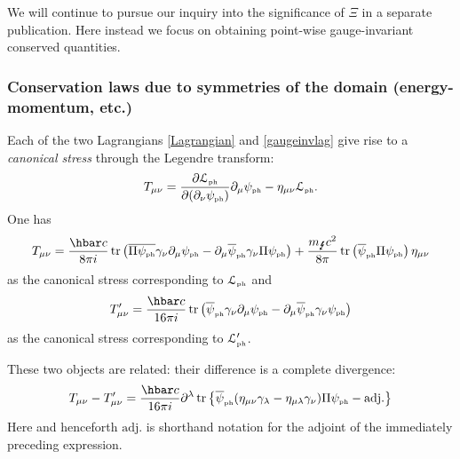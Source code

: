 \documentclass[12pt]{article}
\theoremstyle{definition}
\DeclareMathOperator{\tr}{tr}
\numberwithin{equation}{section}
\newcommand{\beq}{\begin{equation}}
\newcommand{\eeq}{\end{equation}}
\newcommand{\p}{\partial}
\newcommand{\cLph}{{\mathcal L}_{\mbox{\tiny{ph}}}}
\newcommand{\psiPH}{{\psi_{\mbox{\rm\tiny ph}}}}
\newcommand{\psiPHb}{{\overline\psi_{\mbox{\rm\tiny ph}}}}
\newcommand{\mPH}{{m_{\mbox{\Lightning}}}}
\newcommand{\la}{\lambda}
\newcommand{\ga}{\gamma}
\begin{document}
 We will continue to pursue our inquiry into the significance of $\Xi$ in a separate publication. 
 Here instead we focus on obtaining point-wise gauge-invariant conserved quantities.    


\subsubsection{Conservation laws due to symmetries of the domain (energy-momentum, etc.)}\label{sec:energymom}
 Each of the two Lagrangians \eqref{Lagrangian} and \eqref{gaugeinvlag} give rise to a {\em canonical stress} 
\cite{Chr2000} through the Legendre transform:
\beq  T_{\mu\nu} = \frac{\p \cLph}{\p (\p_\nu \psiPH)}\p_\mu\psiPH - \eta_{\mu\nu} \cLph.\eeq
One has
\beq \label{Tmunu}
T_{\mu\nu} = \frac{\hbar c}{8 \pi i} \tr \left( \overline{\Pi\psiPH}\ga_\nu\p_\mu \psiPH - \p_\mu \psiPHb \ga_\nu \Pi\psiPH \right) 
+\frac{\mPH c^2}{8\pi} \tr\left( \psiPHb \Pi \psiPH \right) \eta_{\mu\nu}
\eeq
as the canonical stress corresponding to $\cLph$ and
\beq \label{Tprimemunu}
T'_{\mu\nu} = \frac{\hbar c}{16 \pi i} \tr \left( \psiPHb \ga_\nu \p_\mu \psiPH - \p_\mu \psiPHb \ga_\nu \psiPH\right)
\eeq
as the canonical stress corresponding to $\cLph'$.   

These two objects are related: their difference is a complete divergence:
\beq \label{TTprimediff}
T_{\mu\nu} - T'_{\mu\nu} = 
\frac{\hbar c}{16 \pi i}\p^\la\tr\left\{  \psiPHb(\eta_{\mu\nu}\ga_\la - \eta_{\mu\la}\ga_\nu )\Pi\psiPH - \mbox{adj.}\right\}
\eeq
Here and henceforth $\mbox{adj.}$ is shorthand notation for the adjoint of the immediately preceding expression.
\end{document}
